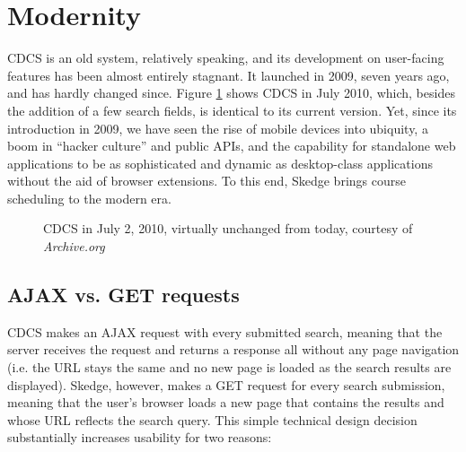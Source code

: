 
\section{Modernity}

CDCS is an old system, relatively speaking, and its development on user-facing features has been almost entirely stagnant. It launched in 2009, seven years ago, and has hardly changed since. Figure \ref{fig:cdcs2010} shows CDCS in July 2010, which, besides the addition of a few search fields, is identical to its current version. Yet, since its introduction in 2009, we have seen the rise of mobile devices into ubiquity, a boom in ``hacker culture'' and public APIs, and the capability for standalone web applications to be as sophisticated and dynamic as desktop-class applications without the aid of browser extensions. To this end, Skedge brings course scheduling to the modern era.

\begin{figure}[ht]
  \centering
  \caption[CDCS in July 2, 2010]{CDCS in July 2, 2010, virtually unchanged from today, courtesy of \emph{Archive.org}\cite{archive}}
  \label{fig:cdcs2010}
\end{figure}

\subsection{AJAX vs. GET requests}

CDCS makes an AJAX request with every submitted search, meaning that the server receives the request and returns a response all without any page navigation (i.e. the URL stays the same and no new page is loaded as the search results are displayed). Skedge, however, makes a GET request for every search submission, meaning that the user's browser loads a new page that contains the results and whose URL reflects the search query. This simple technical design decision substantially increases usability for two reasons:

